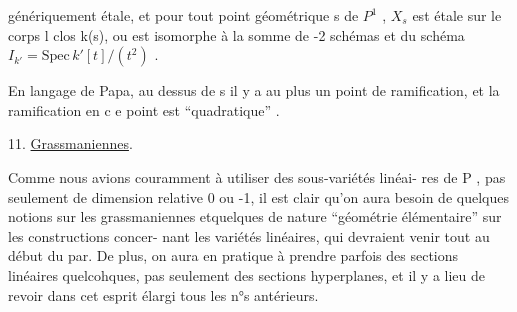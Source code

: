 
génériquement étale, et pour tout point géométrique  s de $P^1$ ,  $X_s$
est étale sur le corps l clos  k(s), ou   est
isomorphe à la somme de -2  schémas    et   du schéma  
$I_{k'} = \mathrm{Spec}\, k'[t]/(t^2)$ .

En langage de Papa, au  dessus de s  il y a au plus un point de
ramification, et la ramification en c e point est ``quadratique'' .

11.  \uline{Grassmaniennes}. 

Comme nous avions couramment à utiliser des sous-variétés linéai-%
res de P , pas seulement de dimension relative 0 ou -1, il est clair
qu'on aura besoin de quelques notions sur les grassmaniennes  etquelques
 de nature ``géométrie élémentaire'' sur les constructions concer-%
nant les variétés linéaires, qui  devraient venir tout au début du par.
De plus, on aura en pratique à prendre parfois des sections linéaires
quelcohques, pas seulement des sections hyperplanes, et il y a lieu de
revoir dans cet esprit élargi tous les n°s antérieurs.

